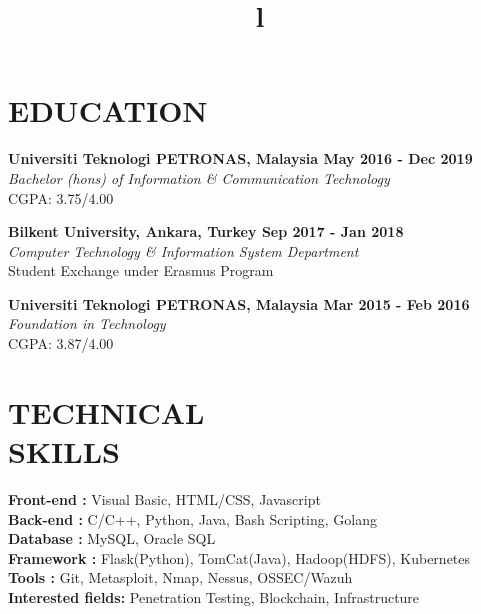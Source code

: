 \documentclass[margin]{res}
\begin{document}
\begin{resume}
\section{EDUCATION}
\textbf{Universiti Teknologi PETRONAS, Malaysia
\hfill{May 2016 - Dec 2019}} \\
{\sl Bachelor (hons) of Information \& Communication Technology} \\
\hfill CGPA: 3.75/4.00

\textbf{Bilkent University, Ankara, Turkey
\hfill{Sep 2017 - Jan 2018}} \\
{\sl Computer Technology \& Information System Department} \\
\hfill Student Exchange under Erasmus Program

\textbf{Universiti Teknologi PETRONAS, Malaysia 
\hfill{Mar 2015 - Feb 2016}} \\
{\sl Foundation in Technology} \\
\hfill CGPA: 3.87/4.00

\section{TECHNICAL\\SKILLS}
\textbf{Front-end : } \quad Visual Basic, HTML/CSS, Javascript
\\
\textbf{Back-end : } \quad C/C++, Python, Java, Bash Scripting, Golang
\\
\textbf{Database :} \quad \quad MySQL, Oracle SQL
\\
\textbf{Framework : } Flask(Python), TomCat(Java), Hadoop(HDFS), Kubernetes
\\
\textbf{Tools : }  \quad \quad \quad Git, Metasploit, Nmap, Nessus, OSSEC/Wazuh
\\
\textbf{Interested fields: } Penetration Testing, Blockchain, Infrastructure
\begin{format}
\title{l}\\
\\
\body\\
\end{format}

\end{resume}
\end{document}
